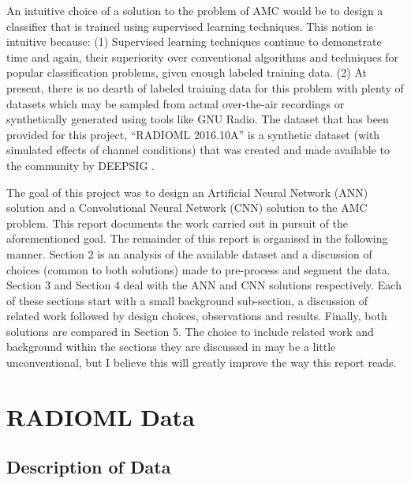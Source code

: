 \documentclass[12pt,journal,onecolumn,twoside]{IEEEtran}
\begin{document}
An intuitive choice of a solution to the problem of AMC would be to design a classifier that is trained using supervised learning techniques. This notion is intuitive because:
(1)	Supervised learning techniques continue to demonstrate time and again, their superiority over conventional algorithms and techniques for popular classification problems, given enough labeled training data. 
(2)	At present, there is no dearth of labeled training data for this problem with plenty of datasets which may be sampled from actual over-the-air recordings or synthetically generated using tools like GNU Radio. The dataset that has been provided for this project, “RADIOML 2016.10A” is a synthetic dataset (with simulated effects of channel conditions) that was created and made available to the community by DEEPSIG \cite{rmlDset}.

The goal of this project was to design an Artificial Neural Network (ANN) solution and a Convolutional Neural Network (CNN) solution to the AMC problem. This report documents the work carried out in pursuit of the aforementioned goal.  The remainder of this report is organised in the following manner. Section 2 is an analysis of the available dataset and a discussion of choices (common to both solutions) made to pre-process and segment the data. Section 3 and Section 4 deal with the ANN and CNN solutions respectively. Each of these sections start with a small background sub-section, a discussion of related work followed by design choices, observations and results. Finally, both solutions are compared in Section 5. The choice to include related work and background within the sections they are discussed in may be a little unconventional, but I believe this will greatly improve the way this report reads.


 

\section{RADIOML Data}

\subsection{Description of Data}
\end{document}
